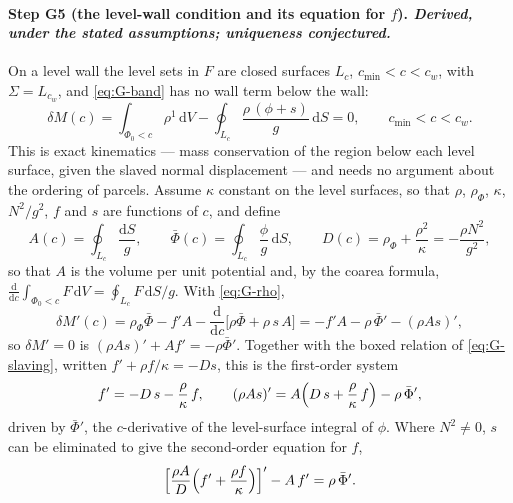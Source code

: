 \documentclass[11pt]{article}
\newcommand{\dS}{\,\mathrm{d}S}
\newcommand{\dV}{\,\mathrm{d}V}
\begin{document}
\paragraph{Step G5 (the level-wall condition and its equation for $f$).
\emph{Derived, under the stated assumptions; uniqueness conjectured.}}
On a level wall the level sets in $F$ are closed surfaces $L_c$,
$c_{\min} < c < c_w$, with $\Sigma = L_{c_w}$, and \eqref{eq:G-band}
has no wall term below the wall:
\begin{equation}
  \delta M(c) = \int_{\Phi_0 < c}\rho^1\dV
  - \oint_{L_c}\frac{\rho\,(\phi + s)}{g}\dS = 0,
  \qquad c_{\min} < c < c_w .
  \label{eq:G-dM}
\end{equation}
This is exact kinematics --- mass conservation of the region below each
level surface, given the slaved normal displacement --- and needs no
argument about the ordering of parcels. Assume $\kappa$ constant on the
level surfaces, so that $\rho$, $\rho_\Phi$, $\kappa$, $N^2/g^2$, $f$
and $s$ are functions of $c$, and define
\begin{equation}
  A(c) = \oint_{L_c}\frac{\mathrm{d}S}{g},
  \qquad
  \bar\Phi(c) = \oint_{L_c}\frac{\phi}{g}\dS,
  \qquad
  D(c) = \rho_\Phi + \frac{\rho^2}{\kappa} = -\frac{\rho N^2}{g^2} ,
\end{equation}
so that $A$ is the volume per unit potential and, by the coarea
formula, $\frac{\mathrm d}{\mathrm dc}\int_{\Phi_0<c}F\dV =
\oint_{L_c}F\,\mathrm dS/g$. With \eqref{eq:G-rho},
\begin{equation}
  \delta M'(c) = \rho_\Phi\bar\Phi - f'A
  - \frac{\mathrm d}{\mathrm dc}\bigl[\rho\bar\Phi + \rho\,s\,A\bigr]
  = -f'A - \rho\,\bar\Phi' - (\rho A s)' ,
\end{equation}
so $\delta M' = 0$ is $(\rho A s)' + A f' = -\rho\bar\Phi'$. Together
with the boxed relation of \eqref{eq:G-slaving}, written
$f' + \rho f/\kappa = -D s$, this is the first-order system
\begin{equation}
  f' = -D\,s - \frac{\rho}{\kappa}\,f ,
  \qquad
  (\rho A s)' = A\Bigl(D\,s + \frac{\rho}{\kappa}\,f\Bigr) - \rho\,\bar\Phi' ,
  \label{eq:G-system}
\end{equation}
driven by $\bar\Phi'$, the $c$-derivative of the level-surface integral
of $\phi$. Where $N^2 \neq 0$, $s$ can be eliminated to give the
second-order equation for $f$,
\begin{equation}
  \Bigl[\frac{\rho A}{D}\Bigl(f' + \frac{\rho f}{\kappa}\Bigr)\Bigr]'
  - A\,f' = \rho\,\bar\Phi' .
  \label{eq:G-ode}
\end{equation}
\end{document}
